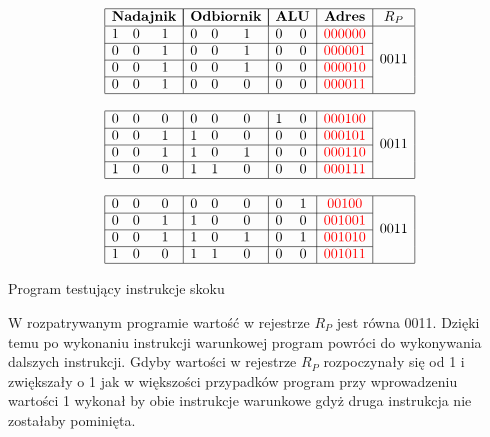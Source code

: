 \documentclass[../main.tex]{subfiles}
\begin{document}
    \begin{table}[ht]
        \[
        \begin{array}{|ccc|ccc|cc|c|c|}
        \hline
        \multicolumn{3}{|c|}{\textbf{Nadajnik}} & \multicolumn{3}{|c|}{\textbf{Odbiornik}}
        & \multicolumn{2}{|c|}{\textbf{ALU}} & \textbf{Adres} & \textbf{$R_P$} \\ \hline
        1 & 0 & 1 & 0 & 0 & 1 & 0 & 0 & \textcolor{red}{0000 00} & \multirow{4}{*}{0011} \\ \cline{1-9}
        0 & 0 & 1 & 0 & 0 & 1 & 0 & 0 & \textcolor{red}{0000 01} & \\ \cline{1-9}
        0 & 0 & 1 & 0 & 0 & 1 & 0 & 0 & \textcolor{red}{0000 10} & \\ \cline{1-9}
        0 & 0 & 1 & 0 & 0 & 0 & 0 & 0 & \textcolor{red}{0000 11} & \\ \hline
        \multicolumn{5}{c}{} \\ \hline
        0 & 0 & 0 & 0 & 0 & 0 & 1 & 0 & \textcolor{red}{0001 00} & \multirow{4}{*}{0011} \\ \cline{1-9}
        0 & 0 & 1 & 1 & 0 & 0 & 0 & 0 & \textcolor{red}{0001 01} & \\ \cline{1-9}
        0 & 0 & 1 & 1 & 0 & 1 & 0 & 0 & \textcolor{red}{0001 10} & \\ \cline{1-9}
        1 & 0 & 0 & 1 & 1 & 0 & 0 & 0 & \textcolor{red}{0001 11} & \\ \hline
        \multicolumn{5}{c}{} \\ \hline
        0 & 0 & 0 & 0 & 0 & 0 & 0 & 1 & \textcolor{red}{0010 0} & \multirow{4}{*}{0011} \\ \cline{1-9}
        0 & 0 & 1 & 1 & 0 & 0 & 0 & 0 & \textcolor{red}{0010 01} &  \\ \cline{1-9}
        0 & 0 & 1 & 1 & 0 & 1 & 0 & 1 & \textcolor{red}{0010 10} & \\ \cline{1-9}
        1 & 0 & 0 & 1 & 1 & 0 & 0 & 0 & \textcolor{red}{0010 11} & \\ \hline
        \end{array}
        \]
        \caption{Program testujący instrukcje skoku}
    \end{table}

    W rozpatrywanym programie wartość w rejestrze $R_P$ jest równa 0011. Dzięki temu po wykonaniu instrukcji warunkowej program 
    powróci do wykonywania dalszych instrukcji. Gdyby wartości w rejestrze $R_P$ rozpoczynały się od 1 i zwiększały o 1  jak w większości 
    przypadków program przy wprowadzeniu wartości 1 wykonał by obie instrukcje warunkowe gdyż druga instrukcja nie zostałaby pominięta.
\end{document}
